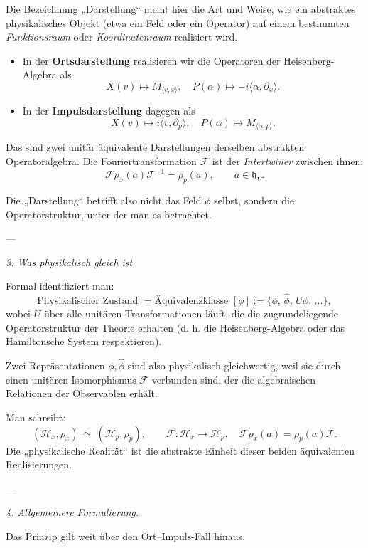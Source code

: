 \documentclass[10pt, letterpaper]{article}
\begin{document}
Die Bezeichnung „Darstellung“ meint hier die Art und Weise,  
wie ein abstraktes physikalisches Objekt (etwa ein Feld oder ein Operator)
auf einem bestimmten \emph{Funktionsraum} oder \emph{Koordinatenraum} realisiert wird.

\begin{itemize}
\item In der \textbf{Ortsdarstellung} realisieren wir die Operatoren der Heisenberg-Algebra als
      \[
      X(v)\mapsto M_{\langle v,x\rangle},\quad P(\alpha)\mapsto -i\langle \alpha,\partial_x\rangle.
      \]
\item In der \textbf{Impulsdarstellung} dagegen als
      \[
      X(v)\mapsto i\langle v,\partial_p\rangle,\quad P(\alpha)\mapsto M_{\langle \alpha,p\rangle}.
      \]
\end{itemize}

Das sind zwei unitär äquivalente Darstellungen derselben abstrakten Operatoralgebra.  
Die Fouriertransformation \(\mathcal{F}\) ist der \emph{Intertwiner} zwischen ihnen:
\[
\mathcal{F}\rho_x(a)\mathcal{F}^{-1}=\rho_p(a),\qquad a\in\mathfrak{h}_V.
\]

Die „Darstellung“ betrifft also nicht das Feld \(\phi\) selbst,  
sondern die Operatorstruktur, unter der man es betrachtet.

---

\emph{3. Was physikalisch gleich ist.}

Formal identifiziert man:
\[
\boxed{
\text{Physikalischer Zustand } = \text{Äquivalenzklasse } [\phi]
:= \{\phi,\,\widehat{\phi},\,U\phi,\,\dots\},
}
\]
wobei \(U\) über alle unitären Transformationen läuft,  
die die zugrundeliegende Operatorstruktur der Theorie erhalten  
(d. h. die Heisenberg-Algebra oder das Hamiltonsche System respektieren).

Zwei Repräsentationen \(\phi,\widehat{\phi}\) sind also physikalisch gleichwertig,  
weil sie durch einen unitären Isomorphismus \(\mathcal{F}\) verbunden sind,  
der die algebraischen Relationen der Observablen erhält.

Man schreibt:
\[
(\mathcal{H}_x,\rho_x)\ \simeq\ (\mathcal{H}_p,\rho_p),
\qquad
\mathcal{F}:\mathcal{H}_x\to\mathcal{H}_p,\quad
\mathcal{F}\rho_x(a)=\rho_p(a)\mathcal{F}.
\]
Die „physikalische Realität“ ist die abstrakte Einheit dieser beiden äquivalenten Realisierungen.

---

\emph{4. Allgemeinere Formulierung.}

Das Prinzip gilt weit über den Ort–Impuls-Fall hinaus.
\end{document}

